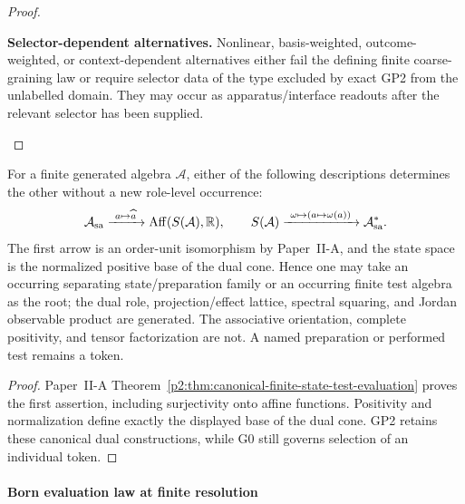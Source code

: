 \documentclass[12pt,a4paper]{article}
\begin{document}
\begin{proof}
\begin{proofsteps}
\item \textbf{Selector-dependent alternatives.}
Nonlinear, basis-weighted, outcome-weighted, or context-dependent alternatives
either fail the defining finite coarse-graining law or require selector data
of the type excluded by exact GP2 from the unlabelled domain.  They may occur
as apparatus/interface readouts after the relevant selector has been supplied.
\end{proofsteps}

\end{proof}

\begin{corollary}
\label{p4:cor:state-test-root-equivalence}
For a finite generated algebra \(\mathcal A\), either of the following
descriptions determines the other without a new role-level occurrence:
\[
 \mathcal A_{\rm sa}
 \xrightarrow{\ a\mapsto\widehat a\ }
 \operatorname{Aff}(S(\mathcal A),\mathbb{R}),
 \qquad
 S(\mathcal A)
 \xrightarrow{\ \omega\mapsto(a\mapsto\omega(a))\ }
 \mathcal A_{\rm sa}^*.
\]
The first arrow is an order-unit isomorphism by Paper~II-A, and the state
space is the normalized positive base of the dual cone.  Hence one may take
an occurring separating state/preparation family or an occurring finite test
algebra as the root; the dual role, projection/effect lattice, spectral
squaring, and Jordan observable product are generated.  The associative
orientation, complete positivity, and tensor factorization are not.  A named preparation or
performed test remains a token.
\end{corollary}

\begin{proof}
Paper~II-A Theorem~\ref{p2:thm:canonical-finite-state-test-evaluation}
proves the first assertion, including surjectivity onto affine functions.
Positivity and normalization define exactly the displayed base of the dual
cone.  GP2 retains these canonical dual constructions, while G0 still governs
selection of an individual token.
\end{proof}



\paragraph{Born evaluation law at finite resolution}
\label{p4:sec:part1-born}
\end{document}
